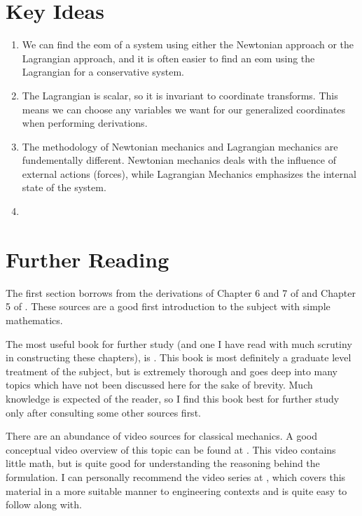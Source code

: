 \section{Key Ideas}
\begin{enumerate}
    \item We can find the \gls{eom} of a system using either the Newtonian approach or the \gls{Lagrangian} approach, and it is often easier to find an \gls{eom} using the \gls{Lagrangian} for a \gls{conservative} system.
    \item The \gls{Lagrangian} is scalar, so it is invariant to coordinate transforms. This means we can choose any variables we want for our generalized coordinates when performing derivations.
    \item The methodology of Newtonian mechanics and \gls{Lagrangian} mechanics are fundementally different. Newtonian mechanics deals with the influence of external \glspl{action} (forces), while \gls{Lagrangian} Mechanics emphasizes the internal state of the system.
    \item %
\end{enumerate}
\section{Further Reading}
The first section borrows from the derivations of Chapter 6 and 7 of  \cite{thornton_classical_nodate} and Chapter 5 of  \cite{cline_variational_2017}. These sources are a good first introduction to the subject with simple mathematics.

The most useful book for further study (and one I have read with much scrutiny in constructing these chapters), is \cite{goldstein_classical_2008}. This book is most definitely a graduate level treatment of the subject, but is extremely thorough and goes deep into many topics which have not been discussed here for the sake of brevity. Much knowledge is expected of the reader, so I find this book best for further study only after consulting some other sources first.

There are an abundance of video sources for classical mechanics. A good conceptual video overview of this topic can be found at \cite{veritasium_closest_2024}. This video contains little math, but is quite good for understanding the reasoning behind the formulation. I can personally recommend the video series at \cite{ross_lagranges_nodate}, which covers this material in a more suitable manner to engineering contexts and is quite easy to follow along with.


